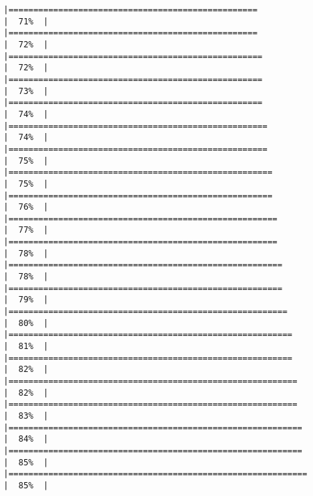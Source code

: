 \documentclass[
]{book}
\begin{document}
\begin{verbatim}
|==================================================                    |  71%  |                                                                              |==================================================                    |  72%  |                                                                              |===================================================                   |  72%  |                                                                              |===================================================                   |  73%  |                                                                              |===================================================                   |  74%  |                                                                              |====================================================                  |  74%  |                                                                              |====================================================                  |  75%  |                                                                              |=====================================================                 |  75%  |                                                                              |=====================================================                 |  76%  |                                                                              |======================================================                |  77%  |                                                                              |======================================================                |  78%  |                                                                              |=======================================================               |  78%  |                                                                              |=======================================================               |  79%  |                                                                              |========================================================              |  80%  |                                                                              |=========================================================             |  81%  |                                                                              |=========================================================             |  82%  |                                                                              |==========================================================            |  82%  |                                                                              |==========================================================            |  83%  |                                                                              |===========================================================           |  84%  |                                                                              |===========================================================           |  85%  |                                                                              |============================================================          |  85%  |                                                                              
\end{verbatim}
\end{document}
